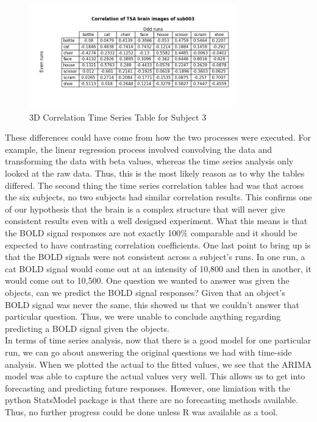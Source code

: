 \documentclass[11pt,twocolumn]{article}
\begin{document}
\begin{figure}[h!]                                                              
\centering                                                                      
\includegraphics[width=90mm]{subtracted_correlation_table_sub003.png}                   
\caption{3D Correlation Time Series Table for Subject 3}                                    
\end{figure}


These differences could have come from how
the two processes were executed. For example, the linear regression process
involved convolving the data and transforming the data with beta values, 
whereas the time series analysis only looked at the raw data. Thus, this is
the most likely reason as to why the tables differed. The second thing the time
series correlation tables had was that across the six subjects, no two subjects
had similar correlation results. This confirms one of our hypothesis that 
the brain is a complex structure that will never give consistent results even
with a well designed experiment. What this means is that the BOLD signal
responses are not exactly 100\% comparable and it should be expected to have
contrasting correlation coefficients. One last point to bring up is that
the BOLD signals were not consistent across a subject's runs. In one run, a
cat BOLD signal would come out at an intensity of 10,800 and then in another,
it would come out to 10,500. One question we wanted to answer was given the
objects, can we predict the BOLD signal responses? Given that an object's
BOLD signal was never the same, this showed us that we couldn't answer that
particular question. Thus, we were unable to conclude anything regarding
predicting a BOLD signal given the objects. \\

In terms of time series analysis, now that there is a good model 
for one particular run, we can go about
answering the original questions we had with time-side analysis. When we 
plotted the actual to the fitted values, we see that the ARIMA model was 
able to capture the actual values very well. This allows us to get into
forecasting and predicting future responses. However, one limiation with
the python StatsModel package is that there are no forecasting methods
available. Thus, no further progress could be done unless R was available
as a tool. \\
\end{document}
